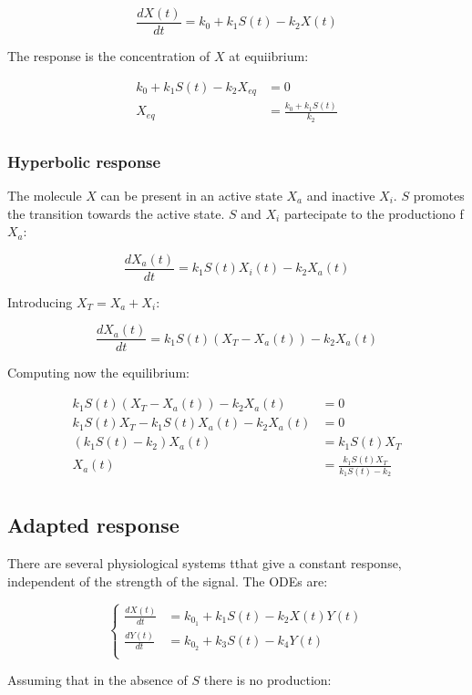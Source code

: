     $$\frac{dX(t)}{dt} = k_0 + k_1S(t) - k_2X(t)$$

    The response is the concentration of $X$ at equiibrium:

    \begin{align*}
      k_0 + k_1S(t) - k_2X_{eq} &= 0\\
      X_{eq} &= \frac{k_0 + k_1S(t)}{k_2}\\
    \end{align*}

    \subsubsection{Hyperbolic response}
    The molecule $X$ can be present in an active state $X_a$ and inactive $X_i$.
    $S$ promotes the transition towards the active state.
    $S$ and $X_i$ partecipate to the productiono f $X_a$:

    $$\frac{dX_a(t)}{dt} = k_1S(t)X_i(t) - k_2X_a(t)$$

    Introducing $X_T = X_a + X_i$:

    $$\frac{dX_a(t)}{dt} = k_1S(t)(X_T - X_a(t)) - k_2X_a(t)$$

    Computing now the equilibrium:

    \begin{align*}
      k_1S(t)(X_T - X_a(t)) - k_2X_a(t) &= 0\\
      k_1S(t)X_T - k_1S(t)X_a(t) - k_2X_a(t) &= 0\\
      (k_1S(t) - k_2)X_a(t) &= k_1S(t)X_T\\
      X_a(t) &= \frac{k_1S(t)X_T}{k_1S(t) - k_2}\\
    \end{align*}

    \subsection{Adapted response}
    There are several physiological systems tthat give a constant response, independent of the strength of the signal.
    The ODEs are:

    $$\begin{cases}
      \frac{dX(t)}{dt} &= k_{0_1} + k_1S(t) - k_2X(t)Y(t)\\
      \frac{dY(t)}{dt} &= k_{0_2} + k_3S(t) - k_4Y(t)\\
    \end{cases}$$

    Assuming that in the absence of $S$ there is no production:

